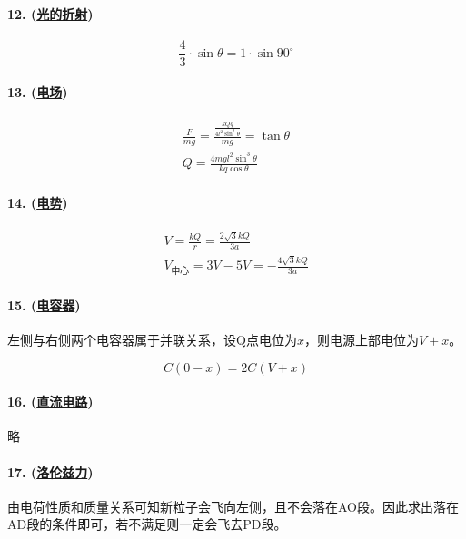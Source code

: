 \paragraph{12. (\hyperref[subsec:光的折射]{光的折射})}

\begin{equation*}
    \frac43\cdot\sin\theta=1\cdot\sin90^\circ
\end{equation*}

\paragraph{13. (\hyperref[subsec:电场]{电场})}

\begin{gather*}
    \frac{F}{mg}=\frac{\frac{kQq}{4l^2\sin^2\theta}}{mg}=\tan\theta\\
    Q=\frac{4mgl^2\sin^3\theta}{kq\cos\theta}
\end{gather*}

\paragraph{14. (\hyperref[subsec:电势]{电势})}

\begin{gather*}
    V=\frac{kQ}{r}=\frac{2\sqrt{3}kQ}{3a}\\
    V_\textrm{中心}=3V-5V=-\frac{4\sqrt{3}kQ}{3a}
\end{gather*}

\paragraph{15. (\hyperref[subsec:电容器]{电容器})} 左侧与右侧两个电容器属于并联关系，设Q点电位为$x$，则电源上部电位为$V+x$。

\begin{equation*}
    C(0-x)=2C(V+x)
\end{equation*}

\paragraph{16. (\hyperref[subsec:直流电路]{直流电路})} 略
\paragraph{17. (\hyperref[subsec:洛伦兹力]{洛伦兹力})} 由电荷性质和质量关系可知新粒子会飞向左侧，且不会落在AO段。因此求出落在AD段的条件即可，若不满足则一定会飞去PD段。


